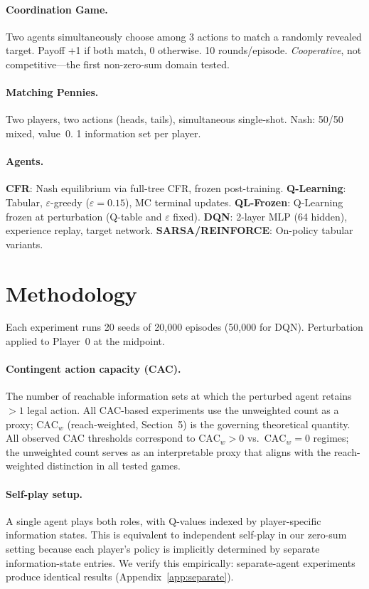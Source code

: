 \documentclass{article}
\begin{document}
\paragraph{Coordination Game.}
Two agents simultaneously choose among 3 actions to match a randomly revealed target. Payoff +1 if both match, 0 otherwise. 10 rounds/episode. \emph{Cooperative}, not competitive---the first non-zero-sum domain tested.

\paragraph{Matching Pennies.}
Two players, two actions (heads, tails), simultaneous single-shot. Nash: 50/50 mixed, value~0. 1 information set per player.

\paragraph{Agents.}
\textbf{CFR}: Nash equilibrium via full-tree CFR, frozen post-training.
\textbf{Q-Learning}: Tabular, $\varepsilon$-greedy ($\varepsilon = 0.15$), MC terminal updates.
\textbf{QL-Frozen}: Q-Learning frozen at perturbation (Q-table and $\varepsilon$ fixed).
\textbf{DQN}: 2-layer MLP (64 hidden), experience replay, target network.
\textbf{SARSA/REINFORCE}: On-policy tabular variants.

\section{Methodology}

Each experiment runs 20 seeds of 20{,}000 episodes (50{,}000 for DQN). Perturbation applied to Player~0 at the midpoint.

\paragraph{Contingent action capacity (CAC).}
The number of reachable information sets at which the perturbed agent retains $>1$ legal action. All CAC-based experiments use the unweighted count as a proxy; $\text{CAC}_w$ (reach-weighted, Section~5) is the governing theoretical quantity. All observed CAC thresholds correspond to $\text{CAC}_w > 0$ vs.\ $\text{CAC}_w = 0$ regimes; the unweighted count serves as an interpretable proxy that aligns with the reach-weighted distinction in all tested games.

\paragraph{Self-play setup.}
A single agent plays both roles, with Q-values indexed by player-specific information states. This is equivalent to independent self-play in our zero-sum setting because each player's policy is implicitly determined by separate information-state entries. We verify this empirically: separate-agent experiments produce identical results (Appendix~\ref{app:separate}).
\end{document}

